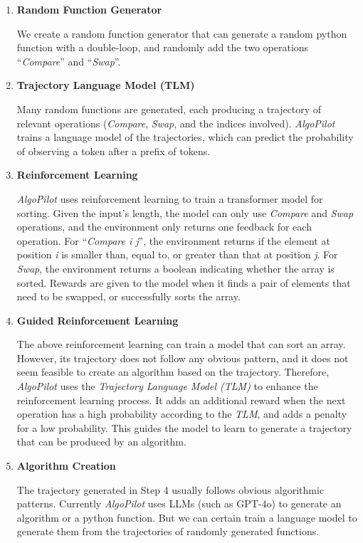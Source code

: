 \documentclass[pdflatex,sn-mathphys-num]{sn-jnl}%
\theoremstyle{thmstyleone}%
\theoremstyle{thmstyletwo}%
\theoremstyle{thmstylethree}%
\begin{document}
\begin{enumerate}
    \item \textbf{Random Function Generator}
    
        \par \noindent We create a random function generator that can generate a random python function with a double-loop, and randomly add the two operations ``\emph{Compare}'' and ``\emph{Swap}''.
        
    \item \textbf{Trajectory Language Model (TLM)}
    
        \par \noindent Many random functions are generated, each producing a trajectory of relevant operations (\emph{Compare}, \emph{Swap}, and the indices involved). \emph{AlgoPilot} trains a language model of the trajectories, which can predict the probability of observing a token after a prefix of tokens.
        
    \item \textbf{Reinforcement Learning}
    
        \par \noindent \emph{AlgoPilot} uses reinforcement learning to train a transformer model for sorting. Given the input's length, the model can only use \emph{Compare} and \emph{Swap} operations, and the environment only returns one feedback for each operation. For ``\emph{Compare i j}'', the environment returns if the element at position \emph{i} is smaller than, equal to, or greater than that at position \emph{j}. For \emph{Swap}, the environment returns a boolean indicating whether the array is sorted. Rewards are given to the model when it finds a pair of elements that need to be swapped, or successfully sorts the array.
        
    \item \textbf{Guided Reinforcement Learning}
    
        \par \noindent The above reinforcement learning can train a model that can sort an array. However, its trajectory does not follow any obvious pattern, and it does not seem feasible to create an algorithm based on the trajectory. Therefore, \emph{AlgoPilot} uses the \emph{Trajectory Language Model (TLM)} to enhance the reinforcement learning process. It adds an additional reward when the next operation has a high probability according to the \emph{TLM}, and adds a penalty for a low probability. This guides the model to learn to generate a trajectory that can be produced by an algorithm.

    \item \textbf{Algorithm Creation}

        \par \noindent The trajectory generated in Step 4 usually follows obvious algorithmic patterns. Currently \emph{AlgoPilot} uses LLMs (such as GPT-4o) to generate an algorithm or a python function. But we can certain train a language model to generate them from the trajectories of randomly generated functions.
    
\end{enumerate}
\end{document}
